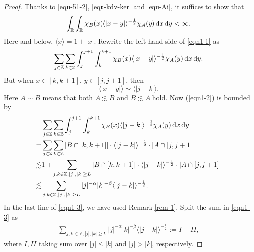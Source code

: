 \documentclass[preprint,12pt]{elsarticle}
\def\d{{\,\rm d}}
\begin{document}
 \begin{proof}
Thanks to \eqref{equ-51-2}, \eqref{equ-kdv-ker} and \eqref{equ-Ai}, it suffices to show that
    \begin{equation}
       \int_{\mathbb{R}}\int_{\mathbb{R}}\chi_B(x)\langle|x-y|\rangle^{-\frac{1}{2}}\chi_A(y)\d x\d y<\infty.\label{eqn1-1}
    \end{equation}
Here and below, $\langle x \rangle = 1+|x|$.
    Rewrite the left hand side of \eqref{eqn1-1}  as
    \begin{equation}
       \sum_{j\in \mathbb{Z}}\sum_{k\in\mathbb{Z}}\int_j^{j+1}\int_k^{k+1}\chi_B(x)\langle|x-y|\rangle^{-\frac{1}{2}}\chi_A(y)\d x\d y.\label{eqn1-2}
    \end{equation}
    But when $x\in [k,k+1]$, $y\in[j,j+1]$, then
    $$
       \langle|x-y|\rangle\sim \langle|j-k|\rangle.
    $$
Here $A\sim B$ means that both $A\lesssim B$ and $B\lesssim A$ hold.
    Now (\ref{eqn1-2}) is bounded by
    \begin{align}
       &\sum_{j\in \mathbb{Z}}\sum_{k\in\mathbb{Z}}\int_j^{j+1}\int_k^{k+1}\chi_B(x)\langle|j-k|\rangle^{-\frac{1}{2}}\chi_A(y)\d x\d y\notag\\
       =&\sum_{j\in\mathbb{Z}}\sum_{k\in\mathbb{Z}}|B\cap [k,k+1]|\cdot \langle|j-k|\rangle^{-\frac{1}{2}}\cdot |A\cap [j,j+1]|\notag\\
       \lesssim & 1+\sum_{j,k\in\mathbb{Z},|j|,|k|\ge L} |B\cap[k,k+1]|\cdot \langle|j-k|\rangle^{-\frac{1}{2}}\cdot|A\cap [j,j+1]|\notag\\
       \lesssim & \sum_{j,k\in\mathbb{Z},|j|,|k|\ge L} |j|^{-\alpha}|k|^{-\beta}\langle |j-k|\rangle^{-\frac{1}{2}}.\label{eqn1-3}
    \end{align}
In the last line of \eqref{eqn1-3}, we have used Remark \ref{rem-1}.
 Split the sum in \eqref{eqn1-3} as
 \begin{align}\label{equ-426-10}
 \sum_{j,k\in\mathbb{Z},|j|,|k|\ge L} |j|^{-\alpha}|k|^{-\beta}\langle |j-k|\rangle^{-\frac{1}{2}}:= I+II,
 \end{align}
 where $I, II$ taking sum over  $|j|\leq |k|$ and $|j|>|k|$, respectively.


\end{proof}
\end{document}

